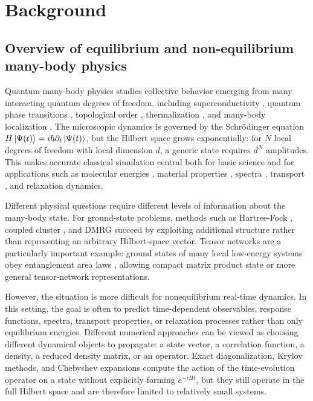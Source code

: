 \documentclass[12pt]{article}
\begin{document}
\section{Background}
\subsection{Overview of equilibrium and non-equilibrium many-body physics}
Quantum many-body physics studies collective behavior emerging from many interacting quantum degrees of freedom, including superconductivity \cite{bardeenTheorySuperconductivity1957}, quantum phase transitions \cite{sachdevQuantumPhaseTransitions2011a}, topological order \cite{wenTopologicalOrdersRigid1990}, thermalization \cite{srednickiChaosQuantumThermalization1994a}, and many-body localization \cite{nandkishoreManyBodyLocalizationThermalization2015a}. 
The microscopic dynamics is governed by the Schrödinger equation \(H\ket{\Psi(t)}=i\hbar\partial_t\ket{\Psi(t)}\), but the Hilbert space grows exponentially: for \(N\) local degrees of freedom with local dimension \(d\), a generic state requires \(d^N\) amplitudes. 
This makes accurate classical simulation central both for basic science and for applications such as molecular energies \cite{kohnSelfConsistentEquationsIncluding1965}, material properties \cite{hohenbergInhomogeneousElectronGas1964}, spectra \cite{rungeDensityFunctionalTheoryTimeDependent1984}, transport \cite{meirLandauerFormulaCurrent1992}, and relaxation dynamics.

Different physical questions require different levels of information about the many-body state.
For ground-state problems, methods such as Hartree-Fock \cite{roothaanNewDevelopmentsMolecular1951}, coupled cluster \cite{bartlettCoupledclusterTheoryQuantum2007}, and DMRG \cite{whiteDensityMatrixFormulation1992b} succeed by exploiting additional structure rather than representing an arbitrary Hilbert-space vector.
Tensor networks are a particularly important example: ground states of many local low-energy systems obey entanglement area laws \cite{eisertColloquiumAreaLaws2010}, allowing compact matrix product state or more general tensor-network representations.

However, the situation is more difficult for nonequilibrium real-time dynamics. In this setting, the goal is often to predict time-dependent observables, response functions, spectra, transport properties, or relaxation processes rather than only equilibrium energies. Different numerical approaches can be viewed as choosing different dynamical objects to propagate: a state vector, a correlation function, a density, a reduced density matrix, or an operator. Exact diagonalization, Krylov methods, and Chebyshev expansions \cite{AnalysisKrylovSubspace, hochbruckKrylovSubspaceApproximations1997, tal-ezerAccurateEfficientScheme1984} compute the action of the time-evolution operator on a state without explicitly forming \(e^{-iHt}\), but they still operate in the full Hilbert space and are therefore limited to relatively small systems.
\end{document}
